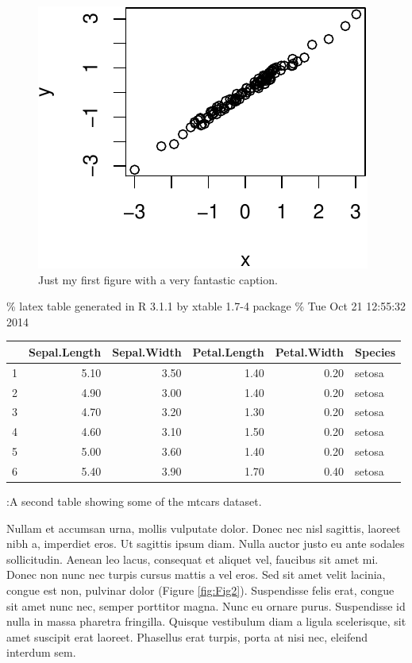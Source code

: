\documentclass[10pt,a4paper,twocolumn]{article}
\begin{document}
\begin{figure}[htbp]
\centering
\includegraphics{./F1000Research_files/figure-latex/Fig1.pdf}
\caption{Just my first figure with a very fantastic
caption.\label{fig:Fig1}}
\end{figure}

\% latex table generated in R 3.1.1 by xtable 1.7-4 package \% Tue Oct
21 12:55:32 2014

\begin{table}[ht]
\centering
\begin{tabular}{rrrrrl}
  \hline
 & Sepal.Length & Sepal.Width & Petal.Length & Petal.Width & Species \\ 
  \hline
1 & 5.10 & 3.50 & 1.40 & 0.20 & setosa \\ 
  2 & 4.90 & 3.00 & 1.40 & 0.20 & setosa \\ 
  3 & 4.70 & 3.20 & 1.30 & 0.20 & setosa \\ 
  4 & 4.60 & 3.10 & 1.50 & 0.20 & setosa \\ 
  5 & 5.00 & 3.60 & 1.40 & 0.20 & setosa \\ 
  6 & 5.40 & 3.90 & 1.70 & 0.40 & setosa \\ 
   \hline
\end{tabular}
\end{table}

:A second table showing some of the mtcars dataset.\label{tab:Table2}

Nullam et accumsan urna, mollis vulputate dolor. Donec nec nisl
sagittis, laoreet nibh a, imperdiet eros. Ut sagittis ipsum diam. Nulla
auctor justo eu ante sodales sollicitudin. Aenean leo lacus, consequat
et aliquet vel, faucibus sit amet mi. Donec non nunc nec turpis cursus
mattis a vel eros. Sed sit amet velit lacinia, congue est non, pulvinar
dolor (Figure \ref{fig:Fig2}). Suspendisse felis erat, congue sit amet
nunc nec, semper porttitor magna. Nunc eu ornare purus. Suspendisse id
nulla in massa pharetra fringilla. Quisque vestibulum diam a ligula
scelerisque, sit amet suscipit erat laoreet. Phasellus erat turpis,
porta at nisi nec, eleifend interdum sem.
\end{document}
